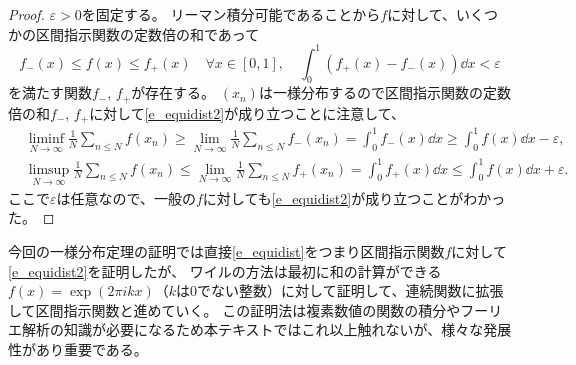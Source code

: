 \begin{proof}
$\varepsilon > 0$を固定する。
リーマン積分可能であることから$f$に対して、いくつかの区間指示関数の定数倍の和であって
$$
f_-(x) \le f(x) \le f_+(x) \quad \forall x \in [0, 1], \quad \int_0^1 (f_+(x)-f_-(x))\dd{x} < \varepsilon
$$
を満たす関数$f_-$, $f_+$が存在する。
$(x_n)$は一様分布するので区間指示関数の定数倍の和$f_-$, $f_+$に対して\eqref{e_equidist2}が成り立つことに注意して、
\begin{align*}
&\liminf_{N \to \infty}\frac{1}{N}\sum_{n \le N}f(x_n) \ge \lim_{N \to \infty}\frac{1}{N}\sum_{n \le N}f_-(x_n) = \int_0^1 f_-(x)\dd{x} \ge \int_0^1 f(x)\dd{x}-\varepsilon, \\
&\limsup_{N \to \infty}\frac{1}{N}\sum_{n \le N}f(x_n) \le \lim_{N \to \infty}\frac{1}{N}\sum_{n \le N}f_+(x_n) = \int_0^1 f_+(x)\dd{x} \le \int_0^1 f(x)\dd{x}+\varepsilon.
\end{align*}
ここで$\varepsilon$は任意なので、一般の$f$に対しても\eqref{e_equidist2}が成り立つことがわかった。
\end{proof}

\begin{remark}
今回の一様分布定理の証明では直接\eqref{e_equidist}をつまり区間指示関数$f$に対して\eqref{e_equidist2}を証明したが、
ワイルの方法は最初に和の計算ができる$f(x) = \exp(2\pi i k x)$（$k$は$0$でない整数）に対して証明して、連続関数に拡張して区間指示関数と進めていく。
この証明法は複素数値の関数の積分やフーリエ解析の知識が必要になるため本テキストではこれ以上触れないが、様々な発展性があり重要である。
\end{remark}
